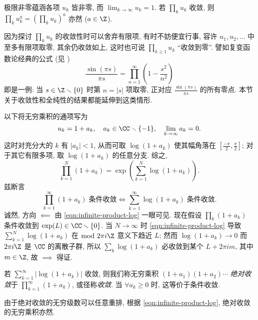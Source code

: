 极限非零蕴涵各项 $u_k$ 皆非零, 而 $\lim_{k \to \infty} u_k = 1$. 若 $\prod_k u_k$ 收敛, 则 $\prod_k u_k^a = (\prod_k u_k)^a$ 亦然 ($a \in \Z$).

\begin{remark}
	因为探讨 $\prod_k u_k$ 的收敛性时可以舍弃有限项, 有时不妨便宜行事, 容许 $u_1, u_2, \ldots$ 中至多有限项取零, 其余仍收敛如上, 这时也可说 $\prod_{k \geq 1} u_k$ ``收敛到零''. 譬如复变函数论经典的公式 (见 \cite[\S 1.7 (3)]{GW})
	\[ \frac{\sin(\pi s)}{\pi s} = \prod_{n=1}^\infty \left( 1 - \frac{s^2}{n^2} \right) \]
	即是一例: 当 $s \in \Z \smallsetminus \{0\}$ 时第 $n = |s|$ 项取零, 正对应 $\frac{\sin(\pi s)}{\pi s}$ 的所有零点. 本节关于收敛性和全纯性的结果都能延伸到这类情形.
\end{remark}

以下将无穷乘积的通项写为
\[ u_k = 1 + a_k, \quad a_k \in \CC \smallsetminus \{-1\}, \quad \lim_{k \to \infty} a_k = 0. \]
这时对充分大的 $k$ 有 $|a_k| < 1$, 从而可取 $\log(1 + a_k)$ 使其幅角落在 $[\frac{-\pi}{2}, \frac{\pi}{2}]$; 对于其它有限多项, 取 $\log(1 + a_k)$ 的任意分支. 综之,
\begin{equation}\label{eqn:infinite-product-log}
	\prod_{k = 1}^N (1 + a_k) = \exp\left( \sum_{k=1}^N \log(1 + a_k) \right).
\end{equation}
兹断言
\[ \prod_{k=1}^\infty (1 + a_k)\; \text{条件收敛} \iff \sum_{k=1}^\infty \log(1 + a_k) \; \text{条件收敛}. \]
诚然, 方向 $\impliedby$ 由 \eqref{eqn:infinite-product-log} 一眼可见. 现在假设 $\prod_k (1 + a_k)$ 条件收敛到 $\exp(L) \in \CC \smallsetminus \{0\}$. 当 $N \to \infty$ 时 \eqref{eqn:infinite-product-log} 导致 $\sum_{k=1}^N \log(1 + a_k)$ 在 $\bmod \; 2\pi i\Z$ 意义下趋近 $L$; 然而 $\log(1 + a_k) \to 0$ 而 $2\pi i\Z$ 是 $\CC$ 的离散子群, 所以 $\sum_k \log(1 + a_k)$ 必收敛到某个 $L + 2\pi i m$, 其中 $m \in \Z$, 故 $\implies$ 得证.

\begin{definition}\label{def:infinite-product-abs}
	若 $\sum_{k=1}^\infty \left|\log(1 + a_k)\right|$ 收敛, 则我们称无穷乘积 $(1 + a_1) (1 + a_2) \cdots$ \emph{绝对收敛}于 $\prod_{k=1}^\infty (1 + a_k)$, 或径称\emph{收敛}. 当 $\forall a_k \geq 0$ 时, 这等价于条件收敛.
\end{definition}

由于绝对收敛的无穷级数可以任意重排, 根据 \eqref{eqn:infinite-product-log}, 绝对收敛的无穷乘积亦然.


